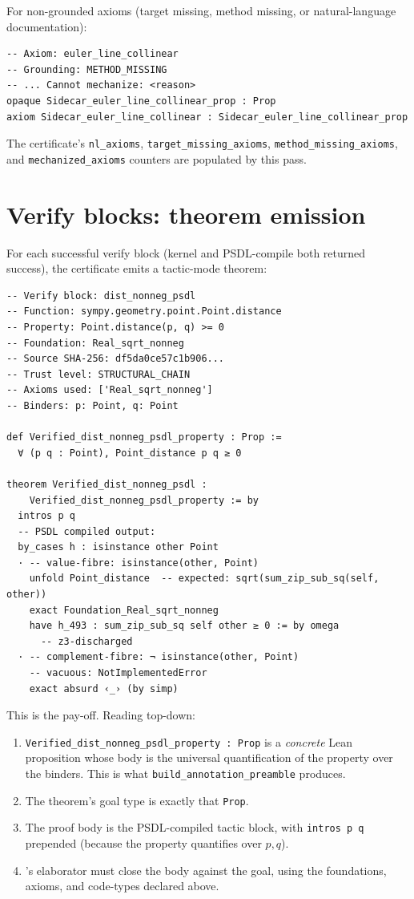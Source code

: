 For non-grounded axioms (target missing, method missing, or
natural-language documentation):
\begin{lstlisting}[language=lean4]
-- Axiom: euler_line_collinear
-- Grounding: METHOD_MISSING
-- ... Cannot mechanize: <reason>
opaque Sidecar_euler_line_collinear_prop : Prop
axiom Sidecar_euler_line_collinear : Sidecar_euler_line_collinear_prop
\end{lstlisting}

The certificate's \texttt{nl\_axioms},
\texttt{target\_missing\_axioms}, \texttt{method\_missing\_axioms},
and \texttt{mechanized\_axioms} counters are populated by this pass.

\section{Verify blocks: theorem emission}
\label{sec:verify-emission}

For each successful verify block (kernel and PSDL-compile both
returned success), the certificate emits a tactic-mode \Lean{}
theorem:

\begin{lstlisting}[language=lean4]
-- Verify block: dist_nonneg_psdl
-- Function: sympy.geometry.point.Point.distance
-- Property: Point.distance(p, q) >= 0
-- Foundation: Real_sqrt_nonneg
-- Source SHA-256: df5da0ce57c1b906...
-- Trust level: STRUCTURAL_CHAIN
-- Axioms used: ['Real_sqrt_nonneg']
-- Binders: p: Point, q: Point

def Verified_dist_nonneg_psdl_property : Prop :=
  ∀ (p q : Point), Point_distance p q ≥ 0

theorem Verified_dist_nonneg_psdl :
    Verified_dist_nonneg_psdl_property := by
  intros p q
  -- PSDL compiled output:
  by_cases h : isinstance other Point
  · -- value-fibre: isinstance(other, Point)
    unfold Point_distance  -- expected: sqrt(sum_zip_sub_sq(self, other))
    exact Foundation_Real_sqrt_nonneg
    have h_493 : sum_zip_sub_sq self other ≥ 0 := by omega
      -- z3-discharged
  · -- complement-fibre: ¬ isinstance(other, Point)
    -- vacuous: NotImplementedError
    exact absurd ‹_› (by simp)
\end{lstlisting}

This is the pay-off.  Reading top-down:
\begin{enumerate}[leftmargin=1.7em]
  \item \texttt{Verified\_dist\_nonneg\_psdl\_property : Prop} is a
    \emph{concrete} Lean proposition whose body is the universal
    quantification of the property over the binders.  This is what
    \texttt{build\_annotation\_preamble} produces.
  \item The theorem's goal type is exactly that \texttt{Prop}.
  \item The proof body is the PSDL-compiled tactic block, with
    \texttt{intros p q} prepended (because the property quantifies
    over $p, q$).
  \item \Lean's elaborator must close the body against the goal,
    using the foundations, axioms, and code-types declared above.
\end{enumerate}

